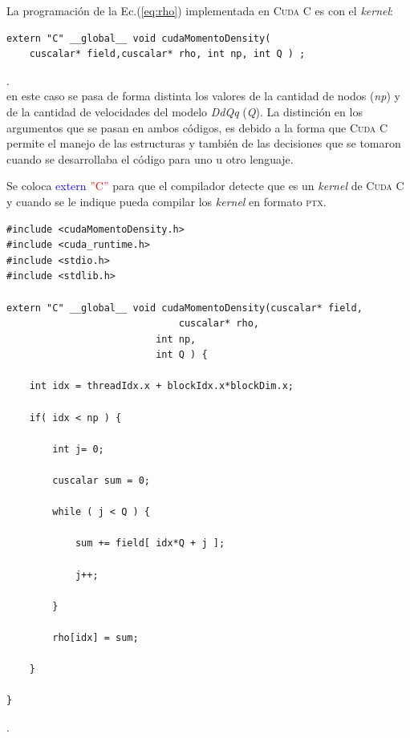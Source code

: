 La programación de la Ec.(\ref{eq:rho}) implementada en \textsc{Cuda C} es con el \textit{kernel}:

{\footnotesize
	\begin{frame}{}
		\begin{lstlisting}
extern "C" __global__ void cudaMomentoDensity(
	cuscalar* field,cuscalar* rho, int np, int Q ) ; 
		\end{lstlisting}
		
	\end{frame}
}.
\\
en este caso se pasa de forma distinta los valores de la cantidad de nodos (\textit{np}) y de la cantidad de velocidades del modelo \textit{DdQq} (\textit{Q}). La distinción en los argumentos que se pasan en ambos códigos, es debido a la forma que \textsc{Cuda C} permite el manejo de las estructuras y también de las decisiones que se tomaron cuando se desarrollaba el código para uno u otro lenguaje.

Se coloca \textcolor{blue}{extern} \textcolor{red}{''C''} para que el compilador detecte que es un \textit{kernel} de \textsc{Cuda C} y cuando se le indique pueda compilar los \textit{kernel} en formato \textsc{ptx}.

\newpage

{\footnotesize
	\begin{frame}{}
		\begin{lstlisting}[frame=single]
#include <cudaMomentoDensity.h>
#include <cuda_runtime.h>
#include <stdio.h>
#include <stdlib.h>

extern "C" __global__ void cudaMomentoDensity(cuscalar* field,
				              cuscalar* rho,
					      int np,
					      int Q ) {
							
	int idx = threadIdx.x + blockIdx.x*blockDim.x;	
	
	if( idx < np ) {	
	
		int j= 0;		
	
		cuscalar sum = 0;		
	
		while ( j < Q ) {		
	
			sum += field[ idx*Q + j ];			
	
			j++;			
	
		}				
	
		rho[idx] = sum;	
	
	}
	
}		
		\end{lstlisting}
		
	\end{frame}
}.
\\


